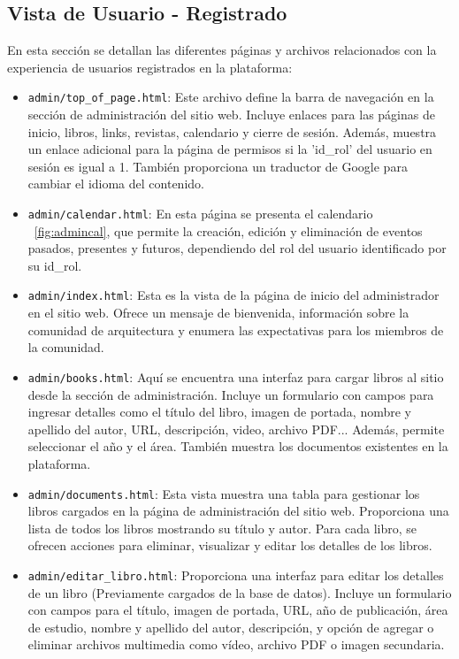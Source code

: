 \documentclass[a4paper, 12pt]{book}
\begin{document}
\subsection{Vista de Usuario - Registrado}
\label{sec:vista_usuarios_registrado}
En esta sección se detallan las diferentes páginas y archivos relacionados con la experiencia de usuarios registrados en la plataforma:

\begin{itemize}
  \item \texttt{admin/top\_of\_page.html}: Este archivo define la barra de navegación en la sección de administración del sitio web. Incluye enlaces para las páginas de inicio, libros, links, revistas, calendario y cierre de sesión. Además, muestra un enlace adicional para la página de permisos si la {'id\_rol'} del usuario en sesión es igual a 1. También proporciona un traductor de Google para cambiar el idioma del contenido.
  \item \texttt{admin/calendar.html}: En esta página se presenta el calendario ~\ref{fig:admincal}, que permite la creación, edición y eliminación de eventos pasados, presentes y futuros, dependiendo del rol del usuario identificado por su id\_rol.
  \item \texttt{admin/index.html}: Esta es la vista de la página de inicio del administrador en el sitio web. Ofrece un mensaje de bienvenida, información sobre la comunidad de arquitectura y enumera las expectativas para los miembros de la comunidad.
  \item \texttt{admin/books.html}: Aquí se encuentra una interfaz para cargar libros al sitio desde la sección de administración. Incluye un formulario con campos para ingresar detalles como el título del libro, imagen de portada, nombre y apellido del autor, URL, descripción, video, archivo PDF... Además, permite seleccionar el año y el área. También muestra los documentos existentes en la plataforma.
  \item \texttt{admin/documents.html}: Esta vista muestra una tabla para gestionar los libros cargados en la página de administración del sitio web. Proporciona una lista de todos los libros mostrando su título y autor. Para cada libro, se ofrecen acciones para eliminar, visualizar y editar los detalles de los libros.
  \item \texttt{admin/editar\_libro.html}: Proporciona una interfaz para editar los detalles de un libro {(Previamente cargados de la base de datos)}. Incluye un formulario con campos para el título, imagen de portada, URL, año de publicación, área de estudio, nombre y apellido del autor, descripción, y opción de agregar o eliminar archivos multimedia como vídeo, archivo PDF o imagen secundaria.

\end{itemize}
\end{document}

